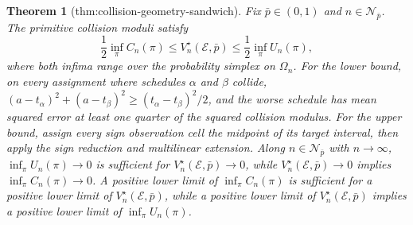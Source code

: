\documentclass{article}
\newtheorem{theorem}{Theorem}
\begin{document}
\begin{theorem}[thm:collision-geometry-sandwich]\label{thm:collision-geometry-sandwich}
Fix \(\bar p\in(0,1)\) and \(n\in\mathcal N_{\bar p}\). The primitive collision moduli satisfy
\[
 \frac12\inf_{\pi}C_n(\pi)
 \le V_n^\star(\mathcal E,\bar p)
 \le\frac12\inf_{\pi}U_n(\pi),
\]
where both infima range over the probability simplex on \(\Omega_n\). For the lower bound, on every assignment where schedules \(\alpha\) and \(\beta\) collide, \((a-t_\alpha)^2+(a-t_\beta)^2\ge(t_\alpha-t_\beta)^2/2\), and the worse schedule has mean squared error at least one quarter of the squared collision modulus. For the upper bound, assign every sign observation cell the midpoint of its target interval, then apply the sign reduction and multilinear extension. Along \(n\in\mathcal N_{\bar p}\) with \(n\to\infty\), \(\inf_\pi U_n(\pi)\to0\) is sufficient for \(V_n^\star(\mathcal E,\bar p)\to0\), while \(V_n^\star(\mathcal E,\bar p)\to0\) implies \(\inf_\pi C_n(\pi)\to0\). A positive lower limit of \(\inf_\pi C_n(\pi)\) is sufficient for a positive lower limit of \(V_n^\star(\mathcal E,\bar p)\), while a positive lower limit of \(V_n^\star(\mathcal E,\bar p)\) implies a positive lower limit of \(\inf_\pi U_n(\pi)\).
\end{theorem}
\end{document}
